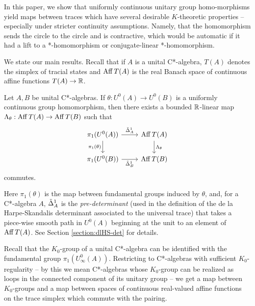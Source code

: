 \documentclass[12pt]{amsart}
\begin{document}
In this paper, we show that uniformly continuous unitary group homo\hyp{}morphisms yield maps between traces which have several desirable $K$-theoretic properties -- especially under stricter continuity assumptions. Namely, that the homomorphism sends the circle to the circle and is contractive, which would be automatic if it had a lift to a *-homomorphism or conjugate-linear *-homomorphism.

We state our main results. Recall that if $A$ is a unital C*-algebra, $T(A)$ denotes the simplex of tracial states and $\operatorname{Aff} T(A)$ is the real Banach space of continuous affine functions $T(A) \to \mathbb{R}$. 

\begin{result}
Let $A,B$ be unital C*-algebras. If $\theta: U^0(A) \to U^0(B)$ is a uniformly continuous group homomorphism, then there exists a bounded $\mathbb{R}$-linear map $\Lambda_\theta: \operatorname{Aff} T(A) \to \operatorname{Aff} T(B)$ such that
\begin{equation}
\begin{tikzcd}
\pi_1(U^0(A)) \arrow[r, "\tD^1_A"] \arrow[d, "\pi_1(\theta)"'] & \Aff T(A) \arrow[d, "\Lambda_\theta"] \\
\pi_1(U^0(B)) \arrow[r, "\tD^1_B"']                            & \Aff T(B)                     
\end{tikzcd}
\end{equation}
commutes.
\end{result}

Here $\pi_1(\theta)$ is the map between fundamental groups induced by $\theta$, and, for a C*-algebra $A$, $\tilde{\Delta}^1_A$ is the \emph{pre-determinant} (used in the definition of the de la Harpe-Skandalis determinant associated to the universal trace) that takes a piece-wise smooth path in $U^0(A)$
beginning at the unit to an element of $\operatorname{Aff} T(A)$. See Section \ref{section:dlHS-det} for details.

Recall that the $K_0$-group of a unital C*-algebra can be identified with the fundamental group $\pi_1(U_{\infty}^0(A))$. Restricting to C*-algebras with sufficient $K_0$-regularity -- by this we mean C*-algebras whose $K_0$-group can be realized as loops in the connected component of its unitary group -- we get a map between $K_0$-groups and a map between spaces of continuous real-valued affine functions on the trace simplex which commute with the pairing.
\end{document}
